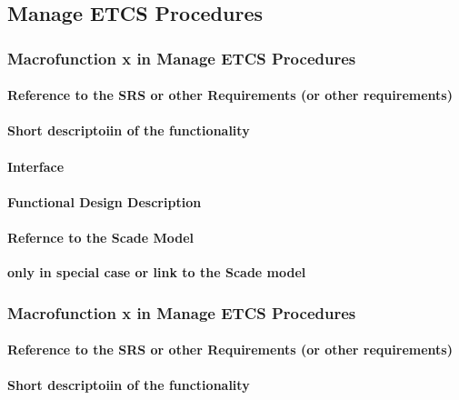 \subsection{Manage ETCS Procedures}

\subsubsection{Macrofunction x in Manage ETCS Procedures}%
\paragraph{Reference to the SRS or other Requirements (or other requirements)}
\paragraph{Short descriptoiin of the functionality}
\paragraph{Interface}
\paragraph{Functional Design Description}
\paragraph{Refernce to the Scade Model}
\textbf{only in special case or link to the Scade model}

\subsubsection{Macrofunction x in Manage ETCS Procedures}%
\paragraph{Reference to the SRS or other Requirements (or other requirements)}
\paragraph{Short descriptoiin of the functionality}
